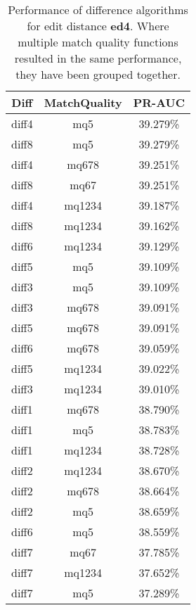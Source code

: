 \begin{table}[tbph]
\begin{center}
\begin{tabular}{|c|c||c|}
\hline
Diff & MatchQuality & PR-AUC  \\
\hline
\hline
diff4 & mq5 & 39.279\% \\
diff8 & mq5 & 39.279\% \\
diff4 & mq678 & 39.251\% \\
diff8 & mq67 & 39.251\% \\
diff4 & mq1234 & 39.187\% \\
diff8 & mq1234 & 39.162\% \\
diff6 & mq1234 & 39.129\% \\
diff5 & mq5 & 39.109\% \\
diff3 & mq5 & 39.109\% \\
diff3 & mq678 & 39.091\% \\
diff5 & mq678 & 39.091\% \\
diff6 & mq678 & 39.059\% \\
diff5 & mq1234 & 39.022\% \\
diff3 & mq1234 & 39.010\% \\
diff1 & mq678 & 38.790\% \\
diff1 & mq5 & 38.783\% \\
diff1 & mq1234 & 38.728\% \\
diff2 & mq1234 & 38.670\% \\
diff2 & mq678 & 38.664\% \\
diff2 & mq5 & 38.659\% \\
diff6 & mq5 & 38.559\% \\
diff7 & mq67 & 37.785\% \\
diff7 & mq1234 & 37.652\% \\
diff7 & mq5 & 37.289\% \\
\hline
\end{tabular}
\end{center}
\caption{Performance of difference algorithms for
  edit distance \textbf{ed4}.  Where multiple match
  quality functions resulted in the same performance, they
  have been grouped together.}
\label{tab:editlongbyed4}
\end{table}
